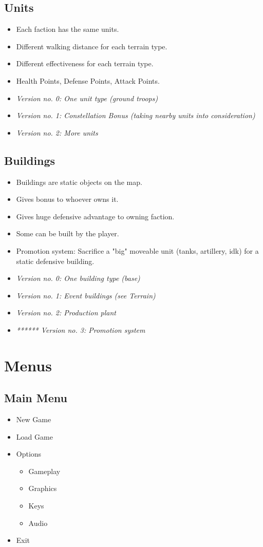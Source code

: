 \documentclass[
	fontsize=12pt,
    paper=a4,
    pagesize=auto,
    parskip=half,
    titlepage=on,
    ngerman
]{scrartcl}
\begin{document}
\subsection{Units}
  \begin{itemize}
  	\item Each faction has the same units.
  	\item Different walking distance for each terrain type.
  	\item Different effectiveness for each terrain type.
  	\item Health Points, Defense Points, Attack Points.
  	\item \textit{Version no. 0: One unit type (ground troops)}
  	\item \textit{Version no. 1: Constellation Bonus (taking nearby units into consideration)}
  	\item \textit{Version no. 2: More units}
  \end{itemize}

\subsection {Buildings}
\begin{itemize}
	\item Buildings are static objects on the map.
	\item Gives bonus to whoever owns it.
	\item Gives huge defensive advantage to owning faction.
	\item Some can be built by the player.
	\item Promotion system: Sacrifice a "big" moveable unit (tanks, artillery, idk) for a static defensive building.
	\item \textit{Version no. 0: One building type (base)}
	\item \textit{Version no. 1: Event buildings (see Terrain)}
	\item \textit{Version no. 2: Production plant}
	\item \textit{****** Version no. 3: Promotion system}
\end{itemize}

\section{Menus}

\subsection{Main Menu}
  \begin{itemize}
  	\item  New Game
  	\item Load Game
  	\item Options
  	\begin{itemize}
  	\item  Gameplay
  	\item  Graphics
  	\item  Keys
  	\item  Audio	
  	\end{itemize}
   \item Exit
  \end{itemize}
\end{document}
